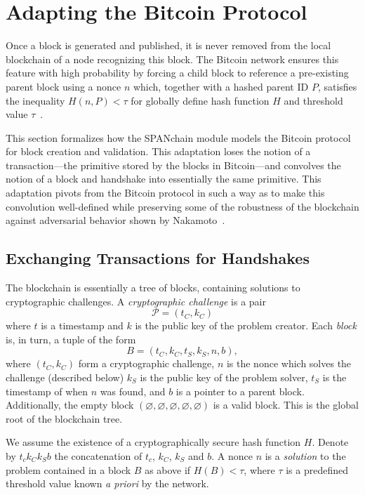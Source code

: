 \section{Adapting the Bitcoin Protocol}
\label{sec:blockchain}

Once a block is generated and published,
it is never removed from the local blockchain of a node recognizing
this block. The Bitcoin network ensures this feature with high
probability by forcing a child block to reference a pre-existing parent
block using a nonce $n$ which, together with a hashed parent ID $P$, satisfies
the inequality $H(n,P)<\tau$ for globally define hash function $H$ and
threshold value $\tau$~\cite{nakamoto2008bitcoin}.

This section formalizes how the SPANchain module models the Bitcoin protocol
for block creation and validation. This adaptation loses the notion of
a transaction---the primitive stored by the blocks in Bitcoin---and convolves the notion
of a block and handshake into essentially the same primitive. This adaptation
pivots from the Bitcoin protocol in such a way as to make this convolution
well-defined while preserving some of the robustness of the blockchain against
adversarial behavior shown by Nakamoto~\cite{nakamoto2008bitcoin}.

\subsection{Exchanging Transactions for Handshakes}

The blockchain is essentially a tree of blocks,
containing solutions to cryptographic challenges.
A \emph{cryptographic challenge} is a pair
\begin{equation*}
	\mathcal P = (t_C, k_C)
\end{equation*}
where $t$ is a timestamp and $k$ is the public key of the problem creator.
Each \emph{block} is, in turn, a tuple of the form
\begin{equation*}
	B = (t_C, k_C, t_S, k_S, n, b),
\end{equation*}
where $(t_C, k_C)$ form a cryptographic challenge,
$n$ is the nonce which solves the challenge (described below)
$k_S$ is the public key of the problem solver,
$t_S$ is the timestamp of when $n$ was found,
and $b$ is a pointer to a parent block.
Additionally,
the empty block $(\varnothing, \varnothing, \varnothing, \varnothing, \varnothing)$
is a valid block.
This is the global root of the blockchain tree.

We assume the existence of a cryptographically secure hash function $H$.
Denote by $t_c k_C k_S b$ the concatenation of $t_c$, $k_C$, $k_S$ and $b$.
A nonce $n$ is a \emph{solution} to the problem contained in a block $B$ as above
if $H(B) < \tau$,
where $\tau$ is a predefined threshold value known \emph{a priori} by the network.

